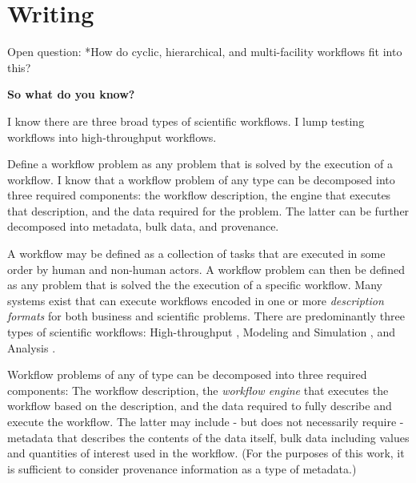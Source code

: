 \section{Writing}

Open question:
*How do cyclic, hierarchical, and multi-facility workflows fit into this?

\textbf{So what do you know?}

I know there are three broad types of scientific workflows. I lump testing
workflows into high-throughput workflows.

Define a workflow problem as any problem that is solved by the execution of a
workflow. I know that a workflow problem of any type can be decomposed into
three required components: the workflow description, the engine that executes
that description, and the data required for the problem. The latter can be
further decomposed into metadata, bulk data, and provenance.

A workflow may be defined as a collection of tasks that are executed in some
order by human and non-human actors. A workflow problem can then be defined as
any problem that is solved the the execution of a specific workflow. Many
systems exist that can execute workflows encoded in one or more
\textit{description formats} for both business and scientific problems. There
are predominantly three types of scientific workflows: High-throughput \cite{},
Modeling and Simulation \cite{}, and Analysis \cite{}.

Workflow problems of any of type can be decomposed into three required
components: The workflow description, the \textit{workflow engine} that
executes the workflow based on the description, and the data required to fully
describe and execute the workflow. The latter may include - but does not
necessarily require - metadata that describes the contents of the data itself,
bulk data including values and quantities of interest used in the workflow.
(For the purposes of this work, it is sufficient to consider provenance
information as a type of metadata.)
